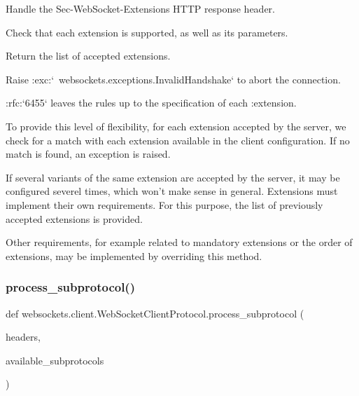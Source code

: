 \begin{DoxyVerb}Handle the Sec-WebSocket-Extensions HTTP response header.

Check that each extension is supported, as well as its parameters.

Return the list of accepted extensions.

Raise :exc:`~websockets.exceptions.InvalidHandshake` to abort the
connection.

:rfc:`6455` leaves the rules up to the specification of each
:extension.

To provide this level of flexibility, for each extension accepted by
the server, we check for a match with each extension available in the
client configuration. If no match is found, an exception is raised.

If several variants of the same extension are accepted by the server,
it may be configured severel times, which won't make sense in general.
Extensions must implement their own requirements. For this purpose,
the list of previously accepted extensions is provided.

Other requirements, for example related to mandatory extensions or the
order of extensions, may be implemented by overriding this method.\end{DoxyVerb}
 \mbox{\label{classwebsockets_1_1client_1_1_web_socket_client_protocol_a840e626c12cdd9a5ce9ccabfa9eba72f}} 
\subsubsection{\texorpdfstring{process\+\_\+subprotocol()}{process\_subprotocol()}}
{\footnotesize\ttfamily def websockets.\+client.\+Web\+Socket\+Client\+Protocol.\+process\+\_\+subprotocol (\begin{DoxyParamCaption}\item[{}]{headers,  }\item[{}]{available\+\_\+subprotocols }\end{DoxyParamCaption})\hspace{0.3cm}{\ttfamily [static]}}

